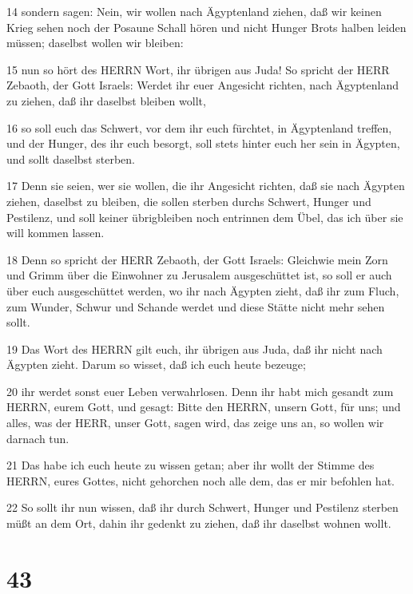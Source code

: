 \par 14 sondern sagen: Nein, wir wollen nach Ägyptenland ziehen, daß wir keinen Krieg sehen noch der Posaune Schall hören und nicht Hunger Brots halben leiden müssen; daselbst wollen wir bleiben:
\par 15 nun so hört des HERRN Wort, ihr übrigen aus Juda! So spricht der HERR Zebaoth, der Gott Israels: Werdet ihr euer Angesicht richten, nach Ägyptenland zu ziehen, daß ihr daselbst bleiben wollt,
\par 16 so soll euch das Schwert, vor dem ihr euch fürchtet, in Ägyptenland treffen, und der Hunger, des ihr euch besorgt, soll stets hinter euch her sein in Ägypten, und sollt daselbst sterben.
\par 17 Denn sie seien, wer sie wollen, die ihr Angesicht richten, daß sie nach Ägypten ziehen, daselbst zu bleiben, die sollen sterben durchs Schwert, Hunger und Pestilenz, und soll keiner übrigbleiben noch entrinnen dem Übel, das ich über sie will kommen lassen.
\par 18 Denn so spricht der HERR Zebaoth, der Gott Israels: Gleichwie mein Zorn und Grimm über die Einwohner zu Jerusalem ausgeschüttet ist, so soll er auch über euch ausgeschüttet werden, wo ihr nach Ägypten zieht, daß ihr zum Fluch, zum Wunder, Schwur und Schande werdet und diese Stätte nicht mehr sehen sollt.
\par 19 Das Wort des HERRN gilt euch, ihr übrigen aus Juda, daß ihr nicht nach Ägypten zieht. Darum so wisset, daß ich euch heute bezeuge;
\par 20 ihr werdet sonst euer Leben verwahrlosen. Denn ihr habt mich gesandt zum HERRN, eurem Gott, und gesagt: Bitte den HERRN, unsern Gott, für uns; und alles, was der HERR, unser Gott, sagen wird, das zeige uns an, so wollen wir darnach tun.
\par 21 Das habe ich euch heute zu wissen getan; aber ihr wollt der Stimme des HERRN, eures Gottes, nicht gehorchen noch alle dem, das er mir befohlen hat.
\par 22 So sollt ihr nun wissen, daß ihr durch Schwert, Hunger und Pestilenz sterben müßt an dem Ort, dahin ihr gedenkt zu ziehen, daß ihr daselbst wohnen wollt.

\chapter{43}

